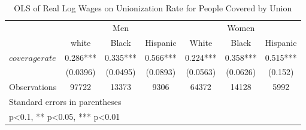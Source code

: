 \begin{table}[htbp]\centering
\def\sym#1{\ifmmode^{#1}\else\(^{#1}\)\fi}
\caption{OLS of Real Log Wages on Unionization Rate for People Covered by Union}
\begin{tabular}{l*{6}{c}}
\hline\hline
                    &\multicolumn{3}{c}{Men}                        &\multicolumn{3}{c}{Women}                      \\\cmidrule(lr){2-4}\cmidrule(lr){5-7}
                    &\multicolumn{1}{c}{white}&\multicolumn{1}{c}{Black}&\multicolumn{1}{c}{Hispanic}&\multicolumn{1}{c}{White}&\multicolumn{1}{c}{Black}&\multicolumn{1}{c}{Hispanic}\\
\hline
$ coveragerate $    &       0.286***&       0.335***&       0.566***&       0.224***&       0.358***&       0.515***\\
                    &    (0.0396)   &    (0.0495)   &    (0.0893)   &    (0.0563)   &    (0.0626)   &     (0.152)   \\
\hline
Observations        &       97722   &       13373   &        9306   &       64372   &       14128   &        5992   \\
\hline\hline
\multicolumn{7}{l}{\footnotesize Standard errors in parentheses}\\
\multicolumn{7}{l}{\footnotesize * p<0.1, ** p<0.05, *** p<0.01}\\
\end{tabular}
\end{table}
